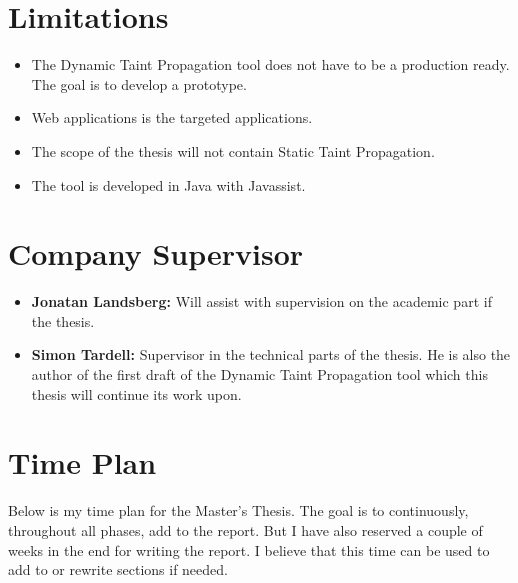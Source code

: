 \documentclass{../kththesis}
\begin{document}
\section{Limitations}
\begin{itemize}  
	\item The Dynamic Taint Propagation tool does not have to be a production ready. The goal is to develop a prototype.
	\item Web applications is the targeted applications.
	\item The scope of the thesis will not contain Static Taint Propagation.
	\item The tool is developed in Java with Javassist.
\end{itemize}


\section{Company Supervisor}
\begin{itemize}
	\item \textbf{Jonatan Landsberg:} Will assist with supervision on the academic part if the thesis.
	\item \textbf{Simon Tardell:} Supervisor in the technical parts of the thesis. He is also the author of the first draft of the Dynamic Taint Propagation tool which this thesis will continue its work upon. 
\end{itemize}


\section{Time Plan}
Below is my time plan for the Master’s Thesis. The goal is to continuously, throughout all phases, add to the report. But I have also reserved a couple of weeks in the end for writing the report. I believe that this time can be used to add to or rewrite sections if needed. \\ \\
\end{document}
